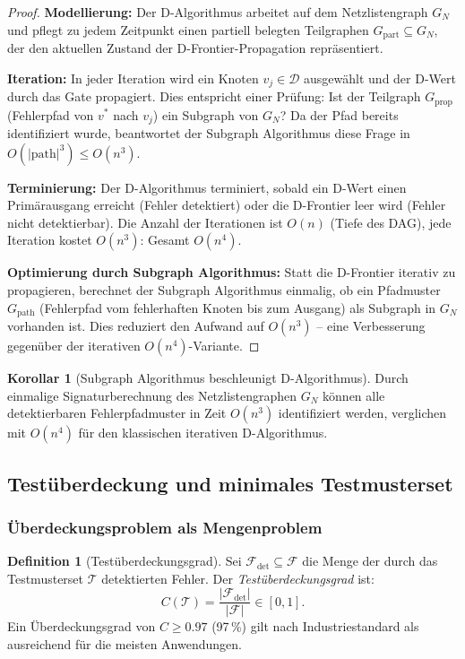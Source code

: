 ﻿\documentclass[a4paper,12pt]{article}
\theoremstyle{definition}
\newtheorem{definition}{Definition}
\newtheorem{korollar}{Korollar}
\begin{document}
\begin{proof}
  \textbf{Modellierung:} Der D-Algorithmus arbeitet auf dem Netzlistengraph $G_N$ und
  pflegt zu jedem Zeitpunkt einen partiell belegten Teilgraphen $G_{\text{part}}
  \subseteq G_N$, der den aktuellen Zustand der D-Frontier-Propagation repräsentiert.

  \textbf{Iteration:} In jeder Iteration wird ein Knoten $v_j \in \mathcal{D}$
  ausgewählt und der D-Wert durch das Gate propagiert. Dies entspricht einer Prüfung:
  Ist der Teilgraph $G_{\text{prop}}$ (Fehlerpfad von $v^*$ nach $v_j$) ein Subgraph
  von $G_N$? Da der Pfad bereits identifiziert wurde, beantwortet der Subgraph Algorithmus
  diese Frage in $O(|\text{path}|^3) \leq O(n^3)$.

  \textbf{Terminierung:} Der D-Algorithmus terminiert, sobald ein D-Wert einen
  Primärausgang erreicht (Fehler detektiert) oder die D-Frontier leer wird (Fehler
  nicht detektierbar). Die Anzahl der Iterationen ist $O(n)$ (Tiefe des DAG), jede
  Iteration kostet $O(n^3)$: Gesamt $O(n^4)$.

  \textbf{Optimierung durch Subgraph Algorithmus:} Statt die D-Frontier iterativ zu
  propagieren, berechnet der Subgraph Algorithmus einmalig, ob ein Pfadmuster
  $G_{\text{path}}$ (Fehlerpfad vom fehlerhaften Knoten bis zum Ausgang) als Subgraph
  in $G_N$ vorhanden ist. Dies reduziert den Aufwand auf $O(n^3)$ -- eine Verbesserung
  gegenüber der iterativen $O(n^4)$-Variante.
\end{proof}

\begin{korollar}[Subgraph Algorithmus beschleunigt D-Algorithmus]\label{kor:datpg}
  Durch einmalige Signaturberechnung des Netzlistengraphen $G_N$ können alle
  detektierbaren Fehlerpfadmuster in Zeit $O(n^3)$ identifiziert werden, verglichen
  mit $O(n^4)$ für den klassischen iterativen D-Algorithmus.
\end{korollar}

\subsection{Testüberdeckung und minimales Testmusterset}

\subsubsection{Überdeckungsproblem als Mengenproblem}

\begin{definition}[Testüberdeckungsgrad]\label{def:testcover}
  Sei $\mathcal{F}_{\text{det}} \subseteq \mathcal{F}$ die Menge der durch das
  Testmusterset $\mathcal{T}$ detektierten Fehler. Der \emph{Testüberdeckungsgrad} ist:
  \[
    C(\mathcal{T}) = \frac{|\mathcal{F}_{\text{det}}|}{|\mathcal{F}|} \in [0, 1].
  \]
  Ein Überdeckungsgrad von $C \geq 0.97$ (97\,\%) gilt nach Industriestandard
  als ausreichend für die meisten Anwendungen.
\end{definition}
\end{document}
